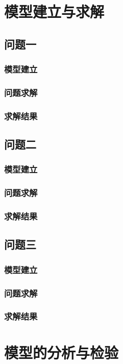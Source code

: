 \documentclass[withoutpreface,bwprint]{cumcmthesis} %
\begin{document}
\section{模型建立与求解}
\subsection{问题一}
\subsubsection{模型建立}
\subsubsection{问题求解}
\subsubsection{求解结果}

\subsection{问题二}
\subsubsection{模型建立}
\subsubsection{问题求解}
\subsubsection{求解结果}

\subsection{问题三}
\subsubsection{模型建立}
\subsubsection{问题求解}
\subsubsection{求解结果}

\section{模型的分析与检验}
\end{document}

